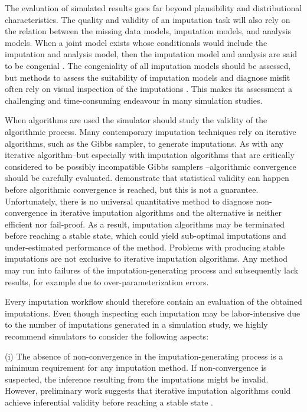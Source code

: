 \documentclass[bimj,fleqn]{w-art}
\begin{document}
The evaluation of simulated results goes far beyond plausibility and distributional characteristics. The quality and validity of an imputation task will also rely on the relation between the missing data models, imputation models, and analysis models. When a joint model exists whose conditionals would include the imputation and analysis model, then the imputation model and analysis are said to be congenial \citep{meng94, bart2015}. The congeniality of all imputation models should be assessed, but methods to assess the suitability of imputation models and diagnose misfit often rely on visual inspection of the imputations \citep[see e.g.][]{abayomi2008diagnostics, bond16}. This makes its assessment a challenging and time-consuming endeavour in many simulation studies. 

When algorithms are used the simulator should study the validity of the algorithmic process. Many contemporary imputation techniques rely on iterative algorithms, such as the Gibbs sampler, to generate imputations. As with any iterative algorithm--but especially with imputation algorithms that are critically considered to be possibly incompatible Gibbs samplers \citep[PIGS,][]{li2012imputing}--algorithmic convergence should be carefully evaluated. \citet{ober21} demonstrate that statistical validity can happen before algorithmic convergence is reached, but this is not a guarantee. Unfortunately, there is no universal quantitative method to diagnose non-convergence in iterative imputation algorithms \citep{zhu15, ober21} and the alternative \citep[visual inspection of the imputation algorithm;][]{buur18} is neither efficient nor fail-proof. As a result, imputation algorithms may be terminated before reaching a stable state, which could yield sub-optimal imputations and under-estimated performance of the method. Problems with producing stable imputations are not exclusive to iterative imputation algorithms. Any method may run into failures of the imputation-generating process and subsequently lack results, for example due to over-parameterization errors.

Every imputation workflow should therefore contain an evaluation of the obtained imputations. Even though inspecting each imputation may be labor-intensive due to the number of imputations generated in a simulation study, we highly recommend simulators to consider the following aspects:

(i) The absence of non-convergence in the imputation-generating process is a minimum requirement for any imputation method. If non-convergence is suspected, the inference resulting from the imputations might be invalid. However, preliminary work suggests that iterative imputation algorithms could achieve inferential validity before reaching a stable state \citep{ober21}. 
\end{document}
